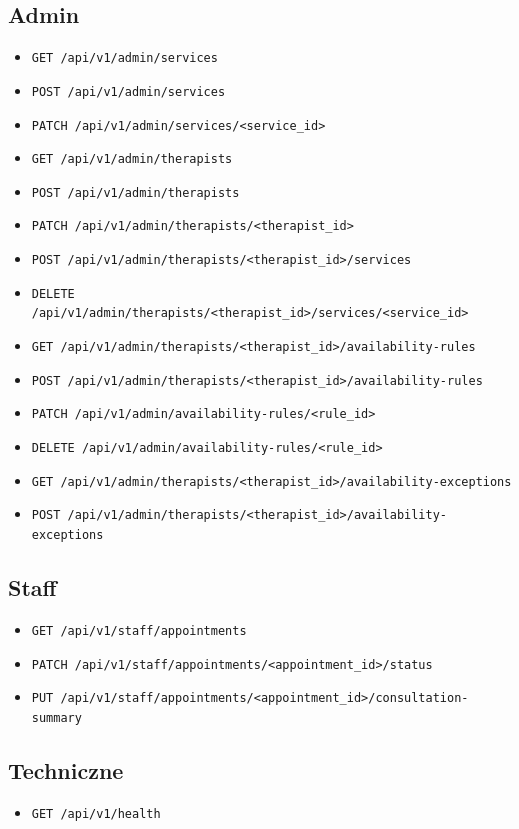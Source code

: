 \documentclass[11pt,a4paper]{article}
\begin{document}
\subsection{Admin}
\begin{itemize}[leftmargin=1.2cm]
    \item \texttt{GET /api/v1/admin/services}
    \item \texttt{POST /api/v1/admin/services}
    \item \texttt{PATCH /api/v1/admin/services/<service\_id>}
    \item \texttt{GET /api/v1/admin/therapists}
    \item \texttt{POST /api/v1/admin/therapists}
    \item \texttt{PATCH /api/v1/admin/therapists/<therapist\_id>}
    \item \texttt{POST /api/v1/admin/therapists/<therapist\_id>/services}
    \item \texttt{DELETE /api/v1/admin/therapists/<therapist\_id>/services/<service\_id>}
    \item \texttt{GET /api/v1/admin/therapists/<therapist\_id>/availability-rules}
    \item \texttt{POST /api/v1/admin/therapists/<therapist\_id>/availability-rules}
    \item \texttt{PATCH /api/v1/admin/availability-rules/<rule\_id>}
    \item \texttt{DELETE /api/v1/admin/availability-rules/<rule\_id>}
    \item \texttt{GET /api/v1/admin/therapists/<therapist\_id>/availability-exceptions}
    \item \texttt{POST /api/v1/admin/therapists/<therapist\_id>/availability-exceptions}
\end{itemize}

\subsection{Staff}
\begin{itemize}[leftmargin=1.2cm]
    \item \texttt{GET /api/v1/staff/appointments}
    \item \texttt{PATCH /api/v1/staff/appointments/<appointment\_id>/status}
    \item \texttt{PUT /api/v1/staff/appointments/<appointment\_id>/consultation-summary}
\end{itemize}

\subsection{Techniczne}
\begin{itemize}[leftmargin=1.2cm]
    \item \texttt{GET /api/v1/health}
\end{itemize}
\end{document}
